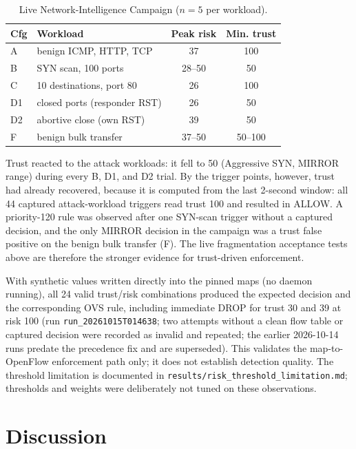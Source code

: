 \documentclass[conference]{IEEEtran}
\begin{document}
\begin{table}[h]
\centering
\caption{Live Network-Intelligence Campaign ($n=5$ per workload).}
\label{tab:ni}
\begin{tabular}{llcc}
\toprule
Cfg & Workload & Peak risk & Min. trust \\
\midrule
A & benign ICMP, HTTP, TCP & 37 & 100 \\
B & SYN scan, 100 ports & 28--50 & 50 \\
C & 10 destinations, port 80 & 26 & 100 \\
D1 & closed ports (responder RST) & 26 & 50 \\
D2 & abortive close (own RST) & 39 & 50 \\
F & benign bulk transfer & 37--50 & 50--100 \\
\bottomrule
\end{tabular}
\end{table}

Trust reacted to the attack workloads: it fell to 50 (Aggressive SYN, MIRROR range) during every B, D1, and D2 trial. By the trigger points, however, trust had already recovered, because it is computed from the last 2-second window: all 44 captured attack-workload triggers read trust 100 and resulted in ALLOW. A priority-120 rule was observed after one SYN-scan trigger without a captured decision, and the only MIRROR decision in the campaign was a trust false positive on the benign bulk transfer (F). The live fragmentation acceptance tests above are therefore the stronger evidence for trust-driven enforcement.

With synthetic values written directly into the pinned maps (no daemon running), all 24 valid trust/risk combinations produced the expected decision and the corresponding OVS rule, including immediate DROP for trust 30 and 39 at risk 100 (run \texttt{run\_20261015T014638}; two attempts without a clean flow table or captured decision were recorded as invalid and repeated; the earlier 2026-10-14 runs predate the precedence fix and are superseded). This validates the map-to-OpenFlow enforcement path only; it does not establish detection quality. The threshold limitation is documented in \texttt{results/risk\_threshold\_limitation.md}; thresholds and weights were deliberately not tuned on these observations.


\section{Discussion}
\end{document}
